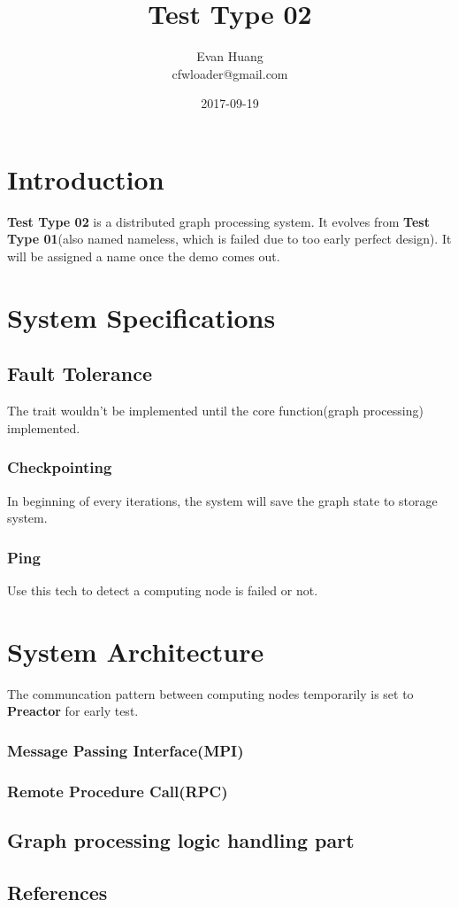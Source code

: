 \documentclass{article}
\title{Test Type 02}
\date{2017-09-19}
\author{Evan Huang \\ cfwloader@gmail.com}
\begin{document}
	\maketitle

	\newpage

	\tableofcontents


	\newpage

	\section{Introduction}
	\textbf{Test Type 02} is a distributed graph processing system. It evolves from \textbf{Test Type 01}(also named nameless, which is failed due to too early perfect design). It will be assigned a name once the demo comes out.

	\section{System Specifications}
	\subsection{Fault Tolerance}
	The trait wouldn't be implemented until the core function(graph processing) implemented.
	\subsubsection{Checkpointing}
	In beginning of every iterations, the system will save the graph state to storage system.
	\subsubsection{Ping}
	Use this tech to detect a computing node is failed or not.

	\section{System Architecture}
	The communcation pattern between computing nodes temporarily is set to \textbf{Preactor} for early test.
	\subsubsection{Message Passing Interface(MPI)}
	\subsubsection{Remote Procedure Call(RPC)}

	\subsection{Graph processing logic handling part}

	\begin{appendix}
		\section{References}
	\end{appendix}
\end{document}
